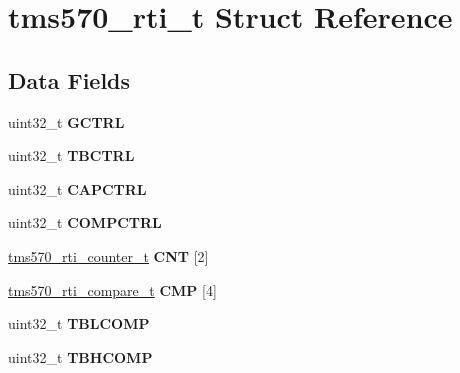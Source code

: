 \hypertarget{structtms570__rti__t}{}\section{tms570\+\_\+rti\+\_\+t Struct Reference}
\label{structtms570__rti__t}
\subsection*{Data Fields}
\begin{DoxyCompactItemize}
\item 
\mbox{\label{structtms570__rti__t_aeecc99221fa95ba75a5a82dec23f4104}} 
uint32\+\_\+t {\bfseries G\+C\+T\+RL}
\item 
\mbox{\label{structtms570__rti__t_af8547f812e0a554982abbdb5401b499f}} 
uint32\+\_\+t {\bfseries T\+B\+C\+T\+RL}
\item 
\mbox{\label{structtms570__rti__t_adb55f4f6e2264555c77a501a252e061a}} 
uint32\+\_\+t {\bfseries C\+A\+P\+C\+T\+RL}
\item 
\mbox{\label{structtms570__rti__t_a4654d20815c4d16e62ab58b6054aad27}} 
uint32\+\_\+t {\bfseries C\+O\+M\+P\+C\+T\+RL}
\item 
\mbox{\label{structtms570__rti__t_a79044d8de69bb62a0c4e5414d61a7c71}} 
\mbox{\hyperlink{structtms570__rti__counter__t}{tms570\+\_\+rti\+\_\+counter\+\_\+t}} {\bfseries C\+NT} \mbox{[}2\mbox{]}
\item 
\mbox{\label{structtms570__rti__t_a21afcffeec39e31c99ab300e162bd9bc}} 
\mbox{\hyperlink{structtms570__rti__compare__t}{tms570\+\_\+rti\+\_\+compare\+\_\+t}} {\bfseries C\+MP} \mbox{[}4\mbox{]}
\item 
\mbox{\label{structtms570__rti__t_a930ee5ba3276397e258cd7bf55713d67}} 
uint32\+\_\+t {\bfseries T\+B\+L\+C\+O\+MP}
\item 
\mbox{\label{structtms570__rti__t_a1f3135ff0fb947f56da6c4f2edf84804}} 
uint32\+\_\+t {\bfseries T\+B\+H\+C\+O\+MP}
\item 

\end{DoxyCompactItemize}
